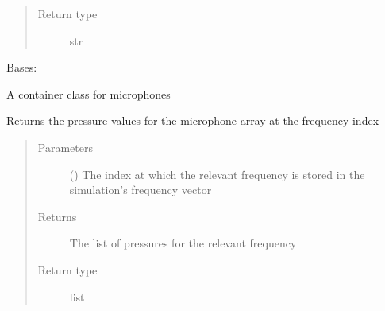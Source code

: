 \documentclass[letterpaper,10pt,english]{sphinxmanual}
\begin{document}
\begin{fulllineitems}
\begin{fulllineitems}
\begin{quote}
\begin{description}
\item[{Return type}] \leavevmode
str

\end{description}\end{quote}

\end{fulllineitems}


\end{fulllineitems}


\begin{fulllineitems}
\label{\detokenize{source/pyzones:pyzones.MicrophoneArray}}
Bases: {\hyperref[\detokenize{source/pyzones:pyzones.SoundObjectArray}]{}}

A container class for microphones

\begin{fulllineitems}
\label{\detokenize{source/pyzones:pyzones.MicrophoneArray.get_pressures}}
Returns the pressure values for the microphone array at the frequency index
\begin{quote}\begin{description}
\item[{Parameters}] \leavevmode
{} () \textendash{} The index at which the relevant frequency is stored in the simulation’s frequency vector

\item[{Returns}] \leavevmode
The list of pressures for the relevant frequency

\item[{Return type}] \leavevmode
list

\end{description}\end{quote}

\end{fulllineitems}



\end{fulllineitems}
\end{document}
